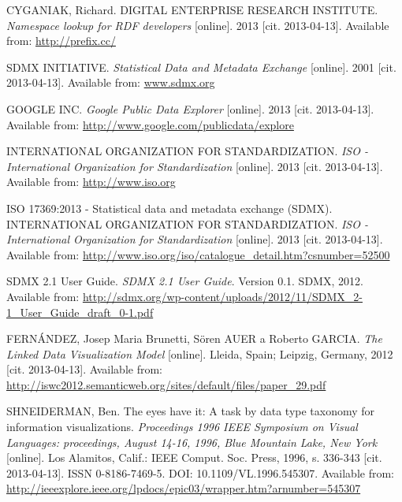 
\def\bibname{Bibliography}
\begin{thebibliography}{99}
\addcontentsline{toc}{chapter}{\bibname}

  {\sc CYGANIAK,} Richard. DIGITAL ENTERPRISE RESEARCH INSTITUTE. 
  \emph{Namespace lookup for RDF developers}
  [online]. 2013 [cit. 2013-04-13]. Available from: \url{http://prefix.cc/}

  {\sc } SDMX INITIATIVE.
  \emph{Statistical Data and Metadata Exchange}
  [online]. 2001 [cit. 2013-04-13]. Available from: \url{www.sdmx.org}

  {\sc } GOOGLE INC.
  \emph{Google Public Data Explorer}
  [online]. 2013 [cit. 2013-04-13]. Available from: \url{http://www.google.com/publicdata/explore}

 {\sc } INTERNATIONAL ORGANIZATION FOR STANDARDIZATION.
 \emph{ISO - International Organization for Standardization}
 [online]. 2013 [cit. 2013-04-13]. Available from: \url{http://www.iso.org}
 
 {\sc} ISO 17369:2013 - Statistical data and metadata exchange (SDMX).
 INTERNATIONAL ORGANIZATION FOR STANDARDIZATION.
 \emph{ISO - International Organization for Standardization} [online]. 2013 [cit. 2013-04-13].
 Available from: \url{http://www.iso.org/iso/catalogue_detail.htm?csnumber=52500}
 
 {\sc } SDMX 2.1 User Guide.
 \emph{SDMX 2.1 User Guide}.
 Version 0.1. SDMX, 2012.
 Available from: \url{http://sdmx.org/wp-content/uploads/2012/11/SDMX_2-1_User_Guide_draft_0-1.pdf}

 {\sc FERNÁNDEZ,} Josep Maria Brunetti, Sören AUER a Roberto GARCIA.
 \emph{The Linked Data Visualization Model}
 [online]. Lleida, Spain; Leipzig, Germany, 2012
 [cit. 2013-04-13].
 Available from: \url{http://iswc2012.semanticweb.org/sites/default/files/paper_29.pdf}

 {\sc SHNEIDERMAN,} Ben.
 The eyes have it: A task by data type taxonomy for information visualizations.
 \emph{Proceedings 1996 IEEE Symposium on Visual Languages: proceedings,
 August 14-16, 1996, Blue Mountain Lake, New York}
 [online]. Los Alamitos, Calif.: IEEE Comput. Soc. Press, 1996, s. 336-343
 [cit. 2013-04-13]. ISSN 0-8186-7469-5. DOI: 10.1109/VL.1996.545307.
 Available from: \url{http://ieeexplore.ieee.org/lpdocs/epic03/wrapper.htm?arnumber=545307}


\end{thebibliography}
